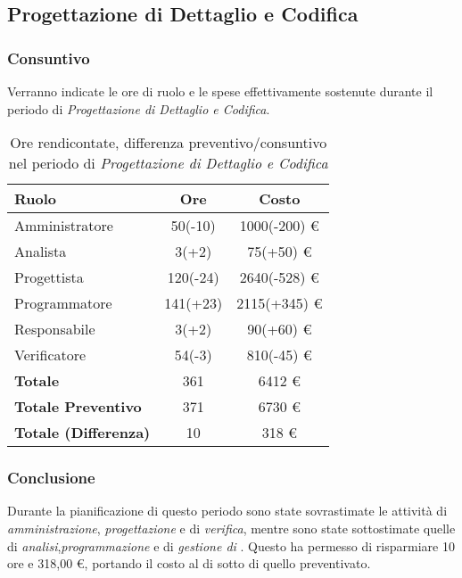 \subsection{Progettazione di Dettaglio e Codifica}
\subsubsection{Consuntivo}
Verranno indicate le ore di ruolo e le spese effettivamente sostenute durante il periodo di \textit{Progettazione di Dettaglio e Codifica}.

\begin{table}[H]
	\centering
	\begin{tabular}{ l c c }
		\textbf{Ruolo} & \textbf{Ore} & \textbf{Costo} \\
		\hline
		Amministratore & 50(-10) & 1000(-200) \euro{} \\
		Analista & 3(+2) & 75(+50) \euro{} \\
		Progettista & 120(-24) & 2640(-528) \euro{} \\ %
		Programmatore & 141(+23) & 2115(+345) \euro{} \\ %
		Responsabile & 3(+2) & 90(+60) \euro{} \\
		Verificatore & 54(-3) & 810(-45) \euro{} \\
		\hline
		\textbf{Totale \glossaryItem{Consuntivo}} & 361 & 6412 \euro{} \\
		\hline
		\textbf{Totale Preventivo} & 371 & 6730 \euro{} \\
		\hline
		\textbf{Totale (Differenza)} & 10 & 318 \euro{} \\
		\hline
	\end{tabular}
	\caption{Ore rendicontate, differenza preventivo/consuntivo nel periodo di \textit{Progettazione di Dettaglio e Codifica}}
\end{table}



\subsubsection{Conclusione}
Durante la pianificazione di questo periodo sono state sovrastimate le attivit\`a di \textit{amministrazione}, \textit{progettazione} e di \textit{verifica}, mentre sono state sottostimate quelle di \textit{analisi},\textit{programmazione} e di \textit{gestione di }.
Questo ha permesso di risparmiare 10 ore e 318,00 \euro{}, portando il costo  al di sotto di quello preventivato.


